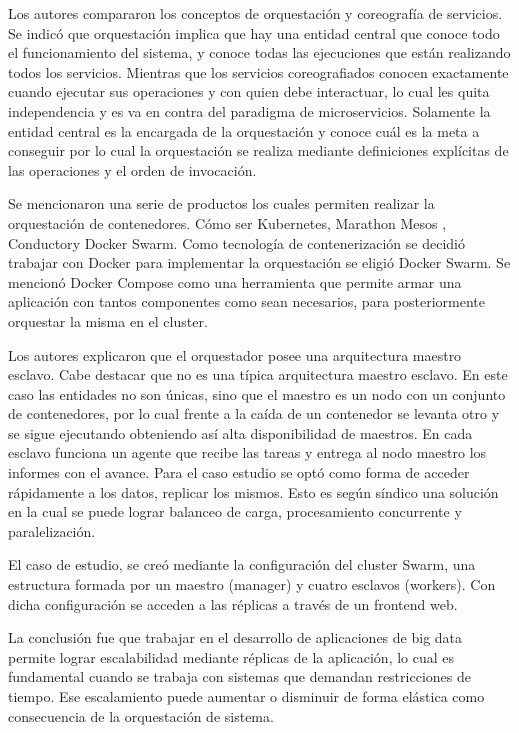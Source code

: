 Los autores compararon los conceptos de orquestación y coreografía de servicios. Se indicó que orquestación implica que hay una entidad central que conoce todo el funcionamiento del sistema, y conoce todas las ejecuciones que están realizando todos los servicios.
Mientras que los servicios coreografiados conocen exactamente cuando ejecutar sus operaciones y con quien debe interactuar, lo cual les quita independencia y es va en contra del paradigma de microservicios.
Solamente la entidad central es la encargada de la orquestación y conoce cuál es la meta a conseguir por lo cual la orquestación se realiza mediante definiciones explícitas de las operaciones y el orden de invocación.\par

Se mencionaron una serie de productos los cuales permiten realizar la orquestación de contenedores.
Cómo ser Kubernetes, Marathon Mesos \cite{matathonMesos}, Conductor\cite{conductor}y Docker Swarm\cite{dockerSwarm}.
Como tecnología de contenerización se decidió trabajar con Docker para implementar la orquestación se eligió  Docker Swarm. Se mencionó Docker Compose\cite{dockerCompose} como una herramienta que permite armar una aplicación con tantos componentes como sean necesarios, para posteriormente orquestar la misma en el cluster.\par

Los autores explicaron que el orquestador posee una arquitectura maestro esclavo. Cabe destacar que no es una típica arquitectura maestro esclavo. En este caso las entidades no son únicas, sino que el maestro es un nodo con un conjunto de contenedores, por lo cual frente a la caída de un contenedor se levanta otro y se sigue ejecutando obteniendo así alta disponibilidad de maestros.
En cada esclavo funciona un agente que recibe las tareas y entrega al nodo maestro los informes con el avance.
Para el caso estudio se optó como forma de acceder rápidamente a los datos, replicar los mismos.
Esto es según síndico una solución en la cual se puede lograr balanceo de carga, procesamiento concurrente y paralelización.\par

El caso de estudio, se creó mediante la configuración del cluster Swarm, una estructura formada por un maestro (manager) y cuatro esclavos (workers).
Con dicha configuración se acceden a las réplicas a través de un frontend web.\par

La conclusión fue que trabajar en el desarrollo de aplicaciones de big data permite lograr escalabilidad mediante réplicas de la aplicación, lo cual es fundamental cuando se trabaja con sistemas que demandan restricciones de tiempo.
Ese escalamiento puede aumentar o disminuir de forma elástica como consecuencia de la orquestación de sistema.\par

